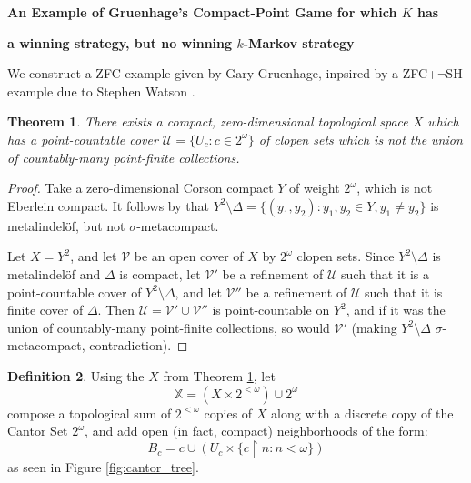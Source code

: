 \documentclass[11pt]{article}
\theoremstyle{plain}
\newtheorem{theorem}{Theorem}
\theoremstyle{definition}
\newtheorem{definition}[theorem]{Definition}
\theoremstyle{remark}
\newcommand{\<}{\langle}
\renewcommand{\>}{\rangle}
\newcommand{\rest}{\restriction}
\begin{document}
\centerline{\bf An Example of Gruenhage's Compact-Point Game for which $K$ has }
\centerline{\bf a winning strategy, but no winning $k$-Markov strategy}

We construct a ZFC example given by Gary Gruenhage, inpsired by a ZFC+$\lnot$SH example due to Stephen Watson \cite{Watson}.

\begin{theorem}\label{basic_x}
There exists a compact, zero-dimensional topological space $X$ which has a point-countable cover $\mathcal{U} = \{U_c : c \in 2^\omega\}$ of clopen sets which is not the union of countably-many point-finite collections.
\end{theorem}

\begin{proof}
Take a zero-dimensional Corson compact $Y$ of weight $2^\omega$, which is not Eberlein compact. It follows by \cite{G1} that $Y^2 \setminus \Delta = \{(y_1,y_2): y_1,y_2 \in Y, y_1\not=y_2\}$ is metalindel\"of, but not $\sigma$-metacompact.

Let $X = Y^2$, and let $\mathcal{V}$ be an open cover of $X$ by $2^\omega$ clopen sets. Since $Y^2 \setminus \Delta$ is metalindel\"of and $\Delta$ is compact, let $\mathcal{V}'$ be a refinement of $\mathcal{U}$ such that it is a point-countable cover of $Y^2 \setminus \Delta$, and let $\mathcal{V}''$ be a refinement of $\mathcal{U}$ such that it is finite cover of $\Delta$. Then $\mathcal{U} = \mathcal{V}'\cup\mathcal{V}''$ is point-countable on $Y^2$, and if it was the union of countably-many point-finite collections, so would $\mathcal{V}'$ (making $Y^2\setminus \Delta$ $\sigma$-metacompact, contradiction).
\end{proof}

\begin{definition}
Using the $X$ from Theorem \ref{basic_x}, let \[\mathbb{X} = (X \times 2^{<\omega}) \cup 2^\omega\] compose a topological sum of $2^{<\omega}$ copies of $X$ along with a discrete copy of the Cantor Set $2^\omega$, and add open (in fact, compact) neighborhoods of the form: 
  \[
    B_c = c \cup (U_c \times \{c\rest n : n < \omega\})
  \]
as seen in Figure \ref{fig:cantor_tree}.
\end{definition}
\end{document}
